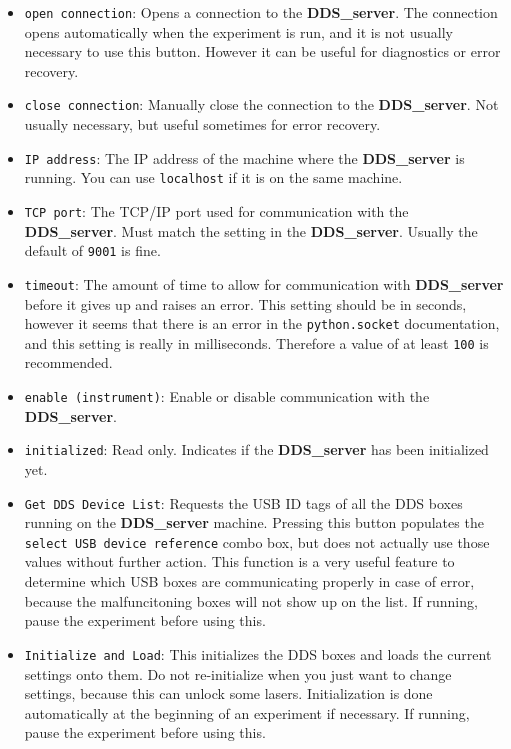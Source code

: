 \documentclass[pdftex,11pt,letterpaper]{article}
\begin{document}
\begin{itemize}
\item \texttt{open connection}:  Opens a connection to the \textbf{DDS\_server}.  The connection opens automatically when the experiment is run, and it is not usually necessary to use this button.  However it can be useful for diagnostics or error recovery.
\item \texttt{close connection}:  Manually close the connection to the \textbf{DDS\_server}.  Not usually necessary, but useful sometimes for error recovery.
\item \texttt{IP address}:  The IP address of the machine where the \textbf{DDS\_server} is running.  You can use \texttt{localhost} if it is on the same machine.
\item \texttt{TCP port}:  The TCP/IP port used for communication with the \textbf{DDS\_server}.  Must match the setting in the \textbf{DDS\_server}.  Usually the default of \texttt{9001} is fine.
\item \texttt{timeout}:  The amount of time to allow for communication with \textbf{DDS\_server} before it gives up and raises an error.  This setting should be in seconds, however it seems that there is an error in the \texttt{python.socket} documentation, and this setting is really in milliseconds.  Therefore a value of at least \texttt{100} is recommended.
\item \texttt{enable (instrument)}:  Enable or disable communication with the \textbf{DDS\_server}.
\item \texttt{initialized}:  Read only.  Indicates if the \textbf{DDS\_server} has been initialized yet.
\item \texttt{Get DDS Device List}:  Requests the USB ID tags of all the DDS boxes running on the \textbf{DDS\_server} machine.  Pressing this button populates the \texttt{select USB device reference} combo box, but does not actually use those values without further action.  This function is a very useful feature to determine which USB boxes are communicating properly in case of error, because the malfuncitoning boxes will not show up on the list.  If running, pause the experiment before using this.
\item \texttt{Initialize and Load}:  This initializes the DDS boxes and loads the current settings onto them.  Do not re-initialize when you just want to change settings, because this can unlock some lasers.  Initialization is done automatically at the beginning of an experiment if necessary.  If running, pause the experiment before using this.

\end{itemize}
\end{document}
